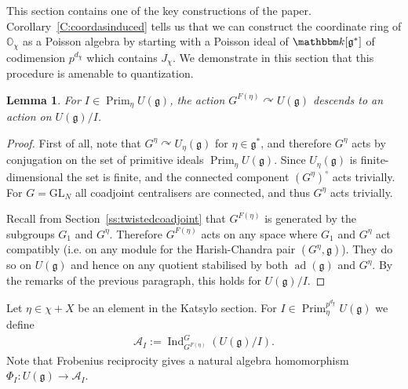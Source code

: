 \documentclass[twoside,12pt,reqno]{amsart}
\newtheorem{Lemma}[Theorem]{Lemma}
\theoremstyle{remark}
\numberwithin{equation}{section}
\def\k{{\mathbbm k}}
\def\ad{\operatorname{ad}}
\def\Ind{\operatorname{Ind}}
\def\Prim{\operatorname{Prim}}
\def\O{{\mathbb O}}
\def\GL{\mathrm{GL}}
\def\g{{\mathfrak g}}
\def\cA{\mathcal{A}}
\newcommand{\A}{\mathcal{A}}
\begin{document}
This section contains one of the key constructions of the paper. Corollary~\ref{C:coordasinduced} tells us that we can construct the coordinate ring of $\O_\chi$ as a Poisson algebra by starting with a Poisson ideal of $\k[\g^*]$ of codimension $p^{d_\chi}$ which contains $J_\chi$. We demonstrate in this section that this procedure is amenable to quantization.

\begin{Lemma}\label{L:actiondescends}
    For $I \in \Prim_\eta U(\g)$, the action $G^{F(\eta)} \curvearrowright U(\g)$ descends to an action on $U(\g)/I$.
\end{Lemma}
\begin{proof}
First of all, note that $G^\eta \curvearrowright U_\eta(\g)$ for $\eta\in \g^*$, and therefore $G^\eta$ acts by conjugation on the set of primitive ideals $\Prim_\eta U(\g)$. Since $U_\eta(\g)$ is finite-dimensional the set is finite, and the connected component $(G^\eta)^\circ$ acts trivially. For $G = \GL_N$ all coadjoint centralisers are connected, and thus $G^\eta$ acts trivially.

    Recall from Section~\ref{ss:twistedcoadjoint} that $G^{F(\eta)}$ is generated by the subgroups $G_1$ and $G^\eta$. Therefore $G^{F(\eta)}$ acts on any space where $G_1$ and $G^\eta$ act compatibly (i.e. on any module for the Harish-Chandra pair $(G^\eta, \g)$). They do so on $U(\g)$ and hence on any quotient stabilised by both $\ad(\g)$ and $G^\eta$. By the remarks of the previous paragraph, this holds for $U(\g)/I$.
\end{proof}

Let $\eta\in\chi+X$ be an element in the Katsylo section. For $I\in\Prim_{\eta}^{p^{d_\chi}}U(\g)$ we define
\begin{eqnarray}
\label{eq:defineAI}
    \A_I := \Ind_{G^{F(\eta)}}^G (U(\g)/I).
\end{eqnarray} Note that Frobenius reciprocity \cite[Proposition I.3.4]{JanRAGS} gives a natural algebra homomorphism $\Phi_I:U(\g)\to \cA_I$.
\end{document}
